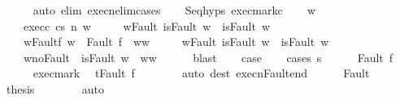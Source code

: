\begin{isabellebody}
\ \ \ \ \isamarkupfalse%
\ {\isacharparenleft}auto\ elim{\isacharcolon}\ execn{\isacharunderscore}elim{\isacharunderscore}cases{\isacharparenright}\isanewline
\ \ \isamarkupfalse%
\ Seq{\isachardot}hyps\ exec{\isacharunderscore}mark{\isacharunderscore}c{}\isanewline
\ \ \isamarkupfalse%
\ w{\isacharprime}\ \ \isanewline
\ \ \ \ exec{\isacharunderscore}c{}{\isacharcolon}\ {\isachardoublequoteopen}{\isasymGamma}{\isasymturnstile}{\isasymlangle}c{}{\isacharcomma}s{\isasymrangle}\ {\isacharequal}n{\isasymRightarrow}\ w{\isacharprime}{\isachardoublequoteclose}\ \isanewline
\ \ \ \ w{\isacharunderscore}Fault{\isacharcolon}\ {\isachardoublequoteopen}isFault\ w\ {\isasymlongrightarrow}\ isFault\ w{\isacharprime}{\isachardoublequoteclose}\ \isanewline
\ \ \ \ w{\isacharprime}{\isacharunderscore}Fault{\isacharunderscore}f{\isacharcolon}\ {\isachardoublequoteopen}w{\isacharprime}\ {\isacharequal}\ Fault\ f\ {\isasymlongrightarrow}\ w{\isacharprime}{\isacharequal}w{\isachardoublequoteclose}\ \isanewline
\ \ \ \ w{\isacharprime}{\isacharunderscore}Fault{\isacharcolon}\ {\isachardoublequoteopen}isFault\ w{\isacharprime}\ {\isasymlongrightarrow}\ isFault\ w{\isachardoublequoteclose}\ \isanewline
\ \ \ \ w{\isacharprime}{\isacharunderscore}noFault{\isacharcolon}\ {\isachardoublequoteopen}{\isasymnot}\ isFault\ w{\isacharprime}\ {\isasymlongrightarrow}\ w{\isacharprime}{\isacharequal}w{\isachardoublequoteclose}\isanewline
\ \ \ \ \isamarkupfalse%
\ blast\isanewline
\ \ \isamarkupfalse%
\ {\isacharquery}case\isanewline
\ \ \isamarkupfalse%
\ {\isacharparenleft}cases\ {\isachardoublequoteopen}s{\isachardoublequoteclose}{\isacharparenright}\isanewline
\ \ \ \ \isamarkupfalse%
\ {\isacharparenleft}Fault\ f{\isacharparenright}\isanewline
\ \ \ \ \isamarkupfalse%
\ exec{\isacharunderscore}mark\ \isamarkupfalse%
\ {\isachardoublequoteopen}t{\isacharequal}Fault\ f{\isachardoublequoteclose}\isanewline
\ \ \ \ \ \ \isamarkupfalse%
\ {\isacharparenleft}auto\ dest{\isacharcolon}\ execn{\isacharunderscore}Fault{\isacharunderscore}end{\isacharparenright}\isanewline
\ \ \ \ \isamarkupfalse%
\ Fault\ \isamarkupfalse%
\ {\isacharquery}thesis\isanewline
\ \ \ \ \ \ \isamarkupfalse%
\ auto\isanewline
\ \ \isamarkupfalse%
\isanewline
\ \ \ \ \isamarkupfalse%

\end{isabellebody}
